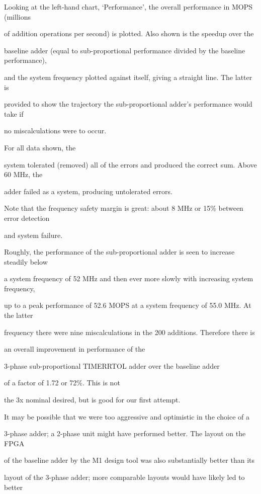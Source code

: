\documentclass[12pt,dvips]{article}
\begin{document}
Looking at the left-hand chart, `Performance', the overall performance in MOPS (millions

of addition operations per second) is plotted. Also shown is the speedup over the

baseline adder (equal to sub-proportional performance divided by the baseline performance),

and the system frequency plotted against itself, giving a straight line. The latter is

provided to show the trajectory the sub-proportional adder's performance would take if

no miscalculations were to occur.



For all data shown, the

system tolerated (removed) all of the errors and produced the correct sum. Above 60 MHz, the

adder failed as a system, producing untolerated errors.

Note that the frequency safety margin is great: about 8 MHz or 15\%  between error detection

and system failure. 



Roughly, the performance of the sub-proportional adder is seen to increase steadily below

a system frequency of 52 MHz and then ever more slowly with increasing system frequency,

up to a peak performance of 52.6 MOPS at a system frequency of 55.0 MHz. At the latter

frequency there were nine miscalculations in the 200 additions. Therefore there is

an overall improvement in performance of the

3-phase sub-proportional TIMERRTOL adder over the baseline adder

of a factor of 1.72 or 72\%. This is not

the 3x nominal desired, but is good for our first attempt.



It may be possible that we were too aggressive and optimistic in the choice of a

3-phase adder; a 2-phase unit might have performed better. The layout on the FPGA

of the baseline adder by the M1 design tool was also substantially better than its

layout of the 3-phase adder; more comparable layouts would have likely led to better
\end{document}
